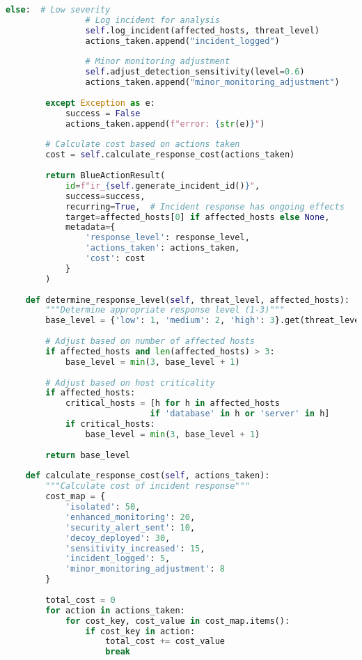 \documentclass[12pt,a4paper]{article}
\begin{document}
\begin{lstlisting}[language=Python, caption=Advanced Blue Agent Actions]
            else:  # Low severity
                # Log incident for analysis
                self.log_incident(affected_hosts, threat_level)
                actions_taken.append("incident_logged")
                
                # Minor monitoring adjustment
                self.adjust_detection_sensitivity(level=0.6)
                actions_taken.append("minor_monitoring_adjustment")
            
        except Exception as e:
            success = False
            actions_taken.append(f"error: {str(e)}")
        
        # Calculate cost based on actions taken
        cost = self.calculate_response_cost(actions_taken)
        
        return BlueActionResult(
            id=f"ir_{self.generate_incident_id()}",
            success=success,
            recurring=True,  # Incident response has ongoing effects
            target=affected_hosts[0] if affected_hosts else None,
            metadata={
                'response_level': response_level,
                'actions_taken': actions_taken,
                'cost': cost
            }
        )
    
    def determine_response_level(self, threat_level, affected_hosts):
        """Determine appropriate response level (1-3)"""
        base_level = {'low': 1, 'medium': 2, 'high': 3}.get(threat_level, 2)
        
        # Adjust based on number of affected hosts
        if affected_hosts and len(affected_hosts) > 3:
            base_level = min(3, base_level + 1)
        
        # Adjust based on host criticality
        if affected_hosts:
            critical_hosts = [h for h in affected_hosts 
                             if 'database' in h or 'server' in h]
            if critical_hosts:
                base_level = min(3, base_level + 1)
        
        return base_level
    
    def calculate_response_cost(self, actions_taken):
        """Calculate cost of incident response"""
        cost_map = {
            'isolated': 50,
            'enhanced_monitoring': 20,
            'security_alert_sent': 10,
            'decoy_deployed': 30,
            'sensitivity_increased': 15,
            'incident_logged': 5,
            'minor_monitoring_adjustment': 8
        }
        
        total_cost = 0
        for action in actions_taken:
            for cost_key, cost_value in cost_map.items():
                if cost_key in action:
                    total_cost += cost_value
                    break
        

\end{lstlisting}
\end{document}
